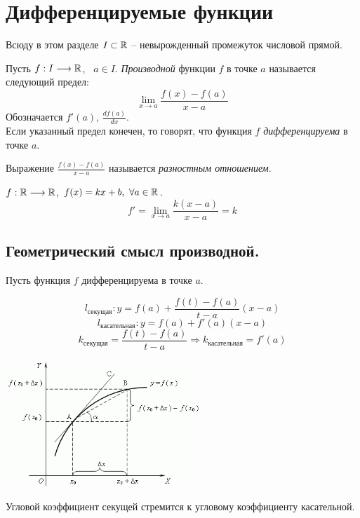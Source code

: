 \section{Дифференцируемые функции}

Всюду в этом разделе $I \subset \mathbb{R}$ -- невырожденный промежуток числовой прямой.

\begin{definition}
    Пусть $f: I \longrightarrow \mathbb{R}$, \ $a \in I$. \textit{Производной} функции $f$ в точке $a$ называется следующий предел:
    \[\lim_{x \rightarrow a} \frac{f(x) - f(a)}{x - a}\]
    Обозначается $f'(a)$, $\frac{df(a)}{dx}$.\\
    Если указанный предел конечен, то говорят, что функция $f$ \textit{дифференцируема} в точке $a$.
\end{definition}

Выражение $\frac{f(x) - f(a)}{x - a}$ называется \textit{разностным отношением}.

\begin{example}
    $f: \mathbb{R} \longrightarrow \mathbb{R}$, $f(x) = kx + b, \ \forall a \in \mathbb{R}$.
    \[f' = \lim_{x \rightarrow a} \frac{k(x - a)}{x - a} = k\]
\end{example}

\subsection{Геометрический смысл производной.}
Пусть функция $f$ дифференцируема в точке $a$. 

\[l_{\text{секущая}}: y = f(a) + \frac{f(t) - f(a)}{t - a} (x - a)\]
\[l_{\text{касательная}}: y = f(a) + f'(a)(x - a)\]
\[k_{\text{секущая}} = \frac{f(t) - f(a)}{t - a} \Rightarrow k_{\text{касательная}} = f'(a) \]

\begin{center}
    \includegraphics[width=0.55\textwidth]{print_1.png}
\end{center}

\begin{note}
    Угловой коэффициент секущей стремится к угловому коэффициенту касательной.
\end{note}

